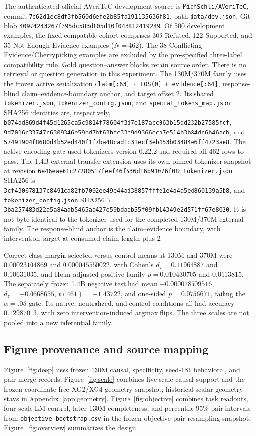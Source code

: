The authenticated official AVeriTeC development source is
\texttt{MichSchli/AVeriTeC}, commit
\nolinkurl{7c62d1ec8df3fb560d6efe2b85fa191135636f81},
path \texttt{data/dev.json}, Git blob
\nolinkurl{40974243267f395dc583d805d10f043812419249}.
Of 500 development examples, the fixed compatible cohort comprises
305 Refuted, 122 Supported, and 35 Not Enough Evidence examples
($N=462$). The 38 Conflicting Evidence/Cherrypicking examples are
excluded by the pre-specified three-label compatibility rule.
Gold question--answer blocks retain source order. There is no retrieval
or question generation in this experiment.
The 130M/370M family uses the frozen active serialization
\texttt{claim[:63] + EOS(0) + evidence[:64]},
response-blind claim--evidence-boundary anchor, and target offset 2.
Its shared \texttt{tokenizer.json},
\texttt{tokenizer\_config.json}, and
\texttt{special\_tokens\_map.json} SHA256 identities are, respectively,
\nolinkurl{b074ad869d4f45d1265ca5c9814f78604f3d7e187acc063b15dd232b27585fcf},
\nolinkurl{9d7016c33747c6309346e59bd7bf63bfc33c9d9366ecb7e514b3b84dc6b46acb},
and \nolinkurl{57491904f8680d4b52ed440f1f7ba48cad1c31ecf3eb453b03484e6ff4723ae8}.
The active-encoding gate used tokenizers version 0.22.2 and required
all 462 rows to pass.
The 1.4B external-transfer extension uses its own pinned tokenizer
snapshot at revision
\nolinkurl{6e46eae61c27280517feef46f536d16b91076f08};
\texttt{tokenizer.json} SHA256 is
\nolinkurl{3cf430678137c8491ca82fb7092ee49e44ad38857fffe1e4a4a5ed860139a5b8},
and \texttt{tokenizer\_config.json} SHA256 is
\nolinkurl{3ba257483d22a5a84aab5465aa427e59bdaeb55f09fb14349e2d571ff67e8020}.
It is not byte-identical to the tokenizer used for the completed
130M/370M external family. The response-blind anchor is the claim--evidence
boundary, with intervention target at consumed claim length plus 2.

Correct-class-margin selected-versus-control means at 130M and 370M
were $0.00023104869$ and $0.000045550022$, with Cohen's
$d_z=0.11964887$ and $0.10631035$, and Holm-adjusted positive-family
$p=0.010430705$ and $0.0113815$. The separately frozen 1.4B
negative test had mean $-0.000078509516$, $d_z=-0.0668655$,
$t(461)=-1.43722$, and one-sided $p=0.0756671$, failing
the $\alpha=.05$ gate. Its native, neutralized, and control conditions
all had accuracy $0.12987013$, with zero intervention-induced argmax
flips. The three scales are not pooled into a new inferential family.

\subsection{Figure provenance and source mapping}
\label{app:provenance}

Figure~\ref{fig:deep} uses frozen 130M causal, specificity, seed-181
behavioral, and pair-merge records. Figure~\ref{fig:scale} combines
five-scale causal support and the frozen coordinate-free XG2/XG4
geometry snapshot; historical scalar geometry stays in
Appendix~\ref{app:geometry}.
Figure~\ref{fig:objective} combines task readouts, four-scale LM control,
later 130M completeness, and percentile 95\% pair intervals from
\texttt{objective\_bootstrap.csv} in the frozen objective pair-resampling
snapshot.
Figure~\ref{fig:overview} summarizes the design.
